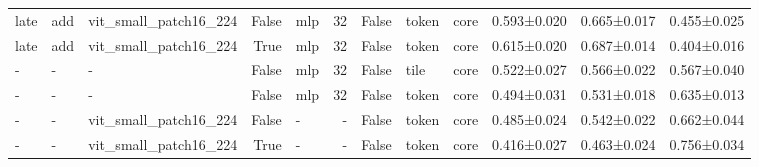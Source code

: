 \begin{table}
\begin{tabular}{lllrlrrlllll}
late & add & vit\_small\_patch16\_224 & False & mlp & 32 & False & token & core & 0.593±0.020 & 0.665±0.017 & 0.455±0.025 \\
late & add & vit\_small\_patch16\_224 & True & mlp & 32 & False & token & core & 0.615±0.020 & 0.687±0.014 & 0.404±0.016 \\
- & - & - & False & mlp & 32 & False & tile & core & 0.522±0.027 & 0.566±0.022 & 0.567±0.040 \\
- & - & - & False & mlp & 32 & False & token & core & 0.494±0.031 & 0.531±0.018 & 0.635±0.013 \\
- & - & vit\_small\_patch16\_224 & False & - & - & False & token & core & 0.485±0.024 & 0.542±0.022 & 0.662±0.044 \\
- & - & vit\_small\_patch16\_224 & True & - & - & False & token & core & 0.416±0.027 & 0.463±0.024 & 0.756±0.034 \\
\bottomrule
\end{tabular}



\end{table}
